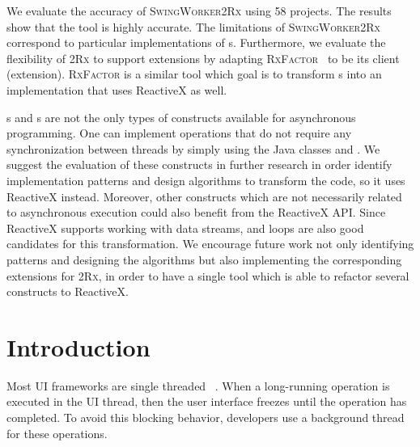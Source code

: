 \documentclass[type=bsc,accentcolor=tud9c]{tudthesis}
\newcommand{\framework}[1]{\textcolor{black!65}{#1}}
\newcommand{\toolcore}{\textsc{2Rx}}
\newcommand{\toolextension}{\textsc{SwingWorker2Rx}}
\begin{document}
We evaluate the accuracy of \toolextension{} using 58 projects. The results show that the tool is highly accurate. The limitations of \toolextension{} correspond to particular implementations of s. Furthermore, we evaluate the flexibility of \toolcore{} to support extensions by adapting \textsc{RxFactor}~\cite{thesisRxFactor} to be its client (extension). \textsc{RxFactor} is a similar tool which goal is to transform s into an implementation that uses \framework{ReactiveX} as well.

s and s are not the only types of constructs available for asynchronous programming. One can implement operations that do not require any synchronization between threads by simply using the \framework{Java} classes  and . We suggest the evaluation of these constructs in further research in order identify implementation patterns and design algorithms to transform the code, so it uses \framework{ReactiveX} instead. Moreover, other constructs which are not necessarily related to asynchronous execution could also benefit from the \framework{ReactiveX} API. Since \framework{ReactiveX} supports working with data streams,  and loops are also good candidates for this transformation. We encourage future work not only identifying patterns and designing the algorithms but also implementing the corresponding extensions for \toolcore{}, in order to have a single tool which is able to refactor several constructs to \framework{ReactiveX}.

\tableofcontents
\listoffigures
\listoftables
\listoflistings


\chapter{Introduction}
\label{chapter:introduction}
Most UI frameworks are single threaded ~\cite{uiSingleThreaded}. When a long-running operation is executed in the UI thread, then the user interface freezes until the operation has completed. To avoid this blocking behavior, developers use a background thread for these operations.
\end{document}
